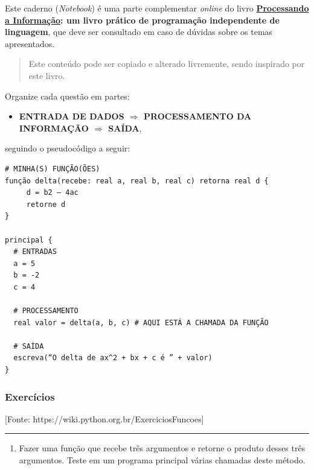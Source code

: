 \documentclass[12pt,a4paper]{article}
\renewcommand{\linethickness}{0.05em}
\providecommand{\tightlist}{%
      \setlength{\itemsep}{0pt}\setlength{\parskip}{0pt}}
\begin{document}
Este caderno (\emph{Notebook}) é uma parte complementar \emph{online} do
livro
\textbf{\href{https://editora.ufabc.edu.br/matematica-e-ciencias-da-computacao/58-processando-a-informacao}{Processando
a Informação}: um livro prático de programação independente de
linguagem}, que deve ser consultado em caso de dúvidas sobre os temas
apresentados.

\begin{quote}
Este conteúdo pode ser copiado e alterado livremente, sendo inspirado
por este livro.
\end{quote}

    Organize cada questão em partes:

\begin{itemize}
\tightlist
\item
  \textbf{ENTRADA DE DADOS \(\Rightarrow\) PROCESSAMENTO DA INFORMAÇÃO
  \(\Rightarrow\) SAÍDA},
\end{itemize}

seguindo o pseudocódigo a seguir:

    \begin{verbatim}
# MINHA(S) FUNÇÃO(ÕES)
função delta(recebe: real a, real b, real c) retorna real d {
     d = b2 – 4ac
     retorne d
}

principal {
  # ENTRADAS
  a = 5
  b = -2
  c = 4

  # PROCESSAMENTO
  real valor = delta(a, b, c) # AQUI ESTÁ A CHAMADA DA FUNÇÃO
  
  # SAÍDA
  escreva(“O delta de ax^2 + bx + c é ” + valor)
}
\end{verbatim}

    \hypertarget{exercuxedcios}{%
\subsubsection{Exercícios}\label{exercuxedcios}}

    {[}Fonte: https://wiki.python.org.br/ExerciciosFuncoes{]}

    \begin{center}\rule{0.5\linewidth}{\linethickness}\end{center}

\begin{enumerate}
\def\labelenumi{\arabic{enumi}.}
\tightlist
\item
  Fazer uma função que recebe três argumentos e retorne o produto desses
  três argumentos. Teste em um programa principal várias chamadas deste
  método.
\end{enumerate}
\end{document}
